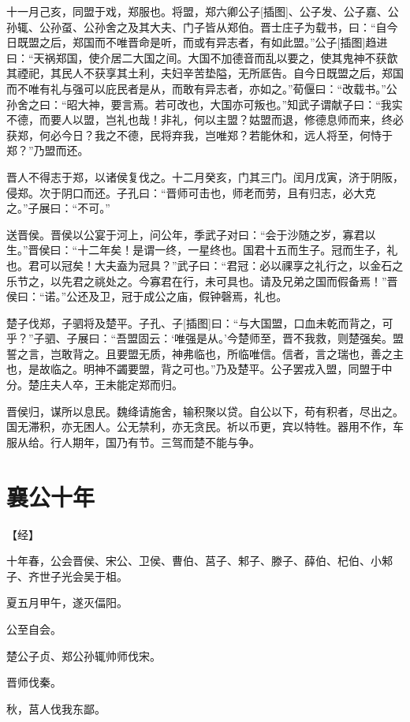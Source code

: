 \documentclass[a4paper,12pt,UTF8,twoside]{ctexbook}
\begin{document}
十一月己亥，同盟于戏，郑服也。将盟，郑六卿公子[插图]、公子发、公子嘉、公孙辄、公孙虿、公孙舍之及其大夫、门子皆从郑伯。晋士庄子为载书，曰：“自今日既盟之后，郑国而不唯晋命是听，而或有异志者，有如此盟。”公子[插图]趋进曰：“天祸郑国，使介居二大国之间。大国不加德音而乱以要之，使其鬼神不获歆其禋祀，其民人不获享其土利，夫妇辛苦垫隘，无所厎告。自今日既盟之后，郑国而不唯有礼与强可以庇民者是从，而敢有异志者，亦如之。”荀偃曰：“改载书。”公孙舍之曰：“昭大神，要言焉。若可改也，大国亦可叛也。”知武子谓献子曰：“我实不德，而要人以盟，岂礼也哉！非礼，何以主盟？姑盟而退，修德息师而来，终必获郑，何必今日？我之不德，民将弃我，岂唯郑？若能休和，远人将至，何恃于郑？”乃盟而还。

晋人不得志于郑，以诸侯复伐之。十二月癸亥，门其三门。闰月戊寅，济于阴阪，侵郑。次于阴口而还。子孔曰：“晋师可击也，师老而劳，且有归志，必大克之。”子展曰：“不可。”

送晋侯。晋侯以公宴于河上，问公年，季武子对曰：“会于沙随之岁，寡君以生。”晋侯曰：“十二年矣！是谓一终，一星终也。国君十五而生子。冠而生子，礼也。君可以冠矣！大夫盍为冠具？”武子曰：“君冠：必以祼享之礼行之，以金石之乐节之，以先君之祧处之。今寡君在行，未可具也。请及兄弟之国而假备焉！”晋侯曰：“诺。”公还及卫，冠于成公之庙，假钟磬焉，礼也。

楚子伐郑，子驷将及楚平。子孔、子[插图]曰：“与大国盟，口血未乾而背之，可乎？”子驷、子展曰：“吾盟固云：‘唯强是从。’今楚师至，晋不我救，则楚强矣。盟誓之言，岂敢背之。且要盟无质，神弗临也，所临唯信。信者，言之瑞也，善之主也，是故临之。明神不蠲要盟，背之可也。”乃及楚平。公子罢戎入盟，同盟于中分。楚庄夫人卒，王未能定郑而归。

晋侯归，谋所以息民。魏绛请施舍，输积聚以贷。自公以下，苟有积者，尽出之。国无滞积，亦无困人。公无禁利，亦无贪民。祈以币更，宾以特牲。器用不作，车服从给。行人期年，国乃有节。三驾而楚不能与争。

\section{襄公十年}



【经】

十年春，公会晋侯、宋公、卫侯、曹伯、莒子、邾子、滕子、薛伯、杞伯、小邾子、齐世子光会吴于柤。

夏五月甲午，遂灭偪阳。

公至自会。

楚公子贞、郑公孙辄帅师伐宋。

晋师伐秦。

秋，莒人伐我东鄙。
\end{document}
